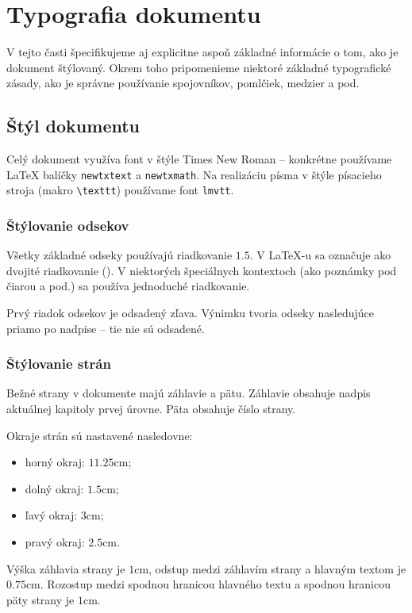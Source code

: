 \chapter{Typografia dokumentu}

V tejto časti špecifikujeme aj explicitne aspoň základné informácie o tom, ako je dokument štýlovaný. Okrem toho pripomenieme niektoré základné typografické zásady, ako je správne používanie spojovníkov, pomlčiek, medzier a pod.

\section{Štýl dokumentu}

Celý dokument využíva font v štýle Times New Roman -- konkrétne používame LaTeX balíčky \texttt{newtxtext} a \texttt{newtxmath}. Na realizáciu písma v štýle písacieho stroja (makro \texttt{{\textbackslash}texttt}) používame font \texttt{lmvtt}.

\subsection{Štýlovanie odsekov}

Všetky základné odseky používajú riadkovanie $\num{1.5}$. V LaTeX-u sa označuje ako dvojité riadkovanie (). V niektorých špeciálnych kontextoch (ako poznámky pod čiarou a pod.) sa používa jednoduché riadkovanie.

Prvý riadok odsekov je odsadený zľava. Výnimku tvoria odseky nasledujúce priamo po nadpise -- tie nie sú odsadené.

\subsection{Štýlovanie strán}

Bežné strany v dokumente majú záhlavie a pätu. Záhlavie obsahuje nadpis aktuálnej kapitoly prvej úrovne. Päta obsahuje číslo strany.

Okraje strán sú nastavené nasledovne:
\begin{itemize}
\item horný okraj: $\num{11.25}$cm;
\item dolný okraj: $\num{1.5}$cm;
\item ľavý okraj: $\num{3}$cm;
\item pravý okraj: $\num{2.5}$cm.
\end{itemize}

Výška záhlavia strany je $1$cm, odstup medzi záhlavím strany a hlavným textom je $\num{0.75}$cm. Rozostup medzi spodnou hranicou hlavného textu a spodnou hranicou päty strany je $1$cm.

